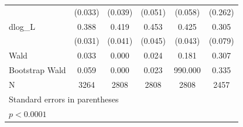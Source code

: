 \begin{table}[htbp]
\begin{tabular}{l*{5}{c}}
            &     (0.033)       &     (0.039)       &     (0.051)       &     (0.058)       &     (0.262)       \\
[1em]
dlog\_L      &       0.388\sym{*}&       0.419\sym{*}&       0.453\sym{*}&       0.425\sym{*}&       0.305       \\
            &     (0.031)       &     (0.041)       &     (0.045)       &     (0.043)       &     (0.079)       \\
\hline
Wald        &       0.033       &       0.000       &       0.024       &       0.181       &       0.307       \\
Bootstrap Wald&       0.059       &       0.000       &       0.023       &     990.000       &       0.335       \\
N           &        3264       &        2808       &        2808       &        2808       &        2457       \\
\hline\hline
\multicolumn{6}{l}{\footnotesize Standard errors in parentheses}\\
\multicolumn{6}{l}{\footnotesize \sym{*} \(p<0.0001\)}\\
\end{tabular}
\end{table}
